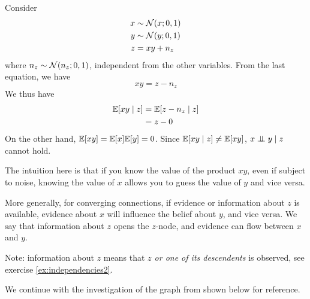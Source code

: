 \begin{exenumerate}
\begin{solution}
     Consider
     \begin{align}
       x & \sim \mathcal{N}(x;0, 1)\\ y & \sim \mathcal{N}(y;0, 1)\\ z&= xy +
       n_z
     \end{align}
     where $n_z \sim \mathcal{N}(n_z; 0, 1)$, independent from the other
     variables. From the last equation, we have
     \begin{equation}
       x y = z - n_z
     \end{equation}
     We thus have
     \begin{align}
       \mathbb{E}[xy \mid z] & = \mathbb{E}[z - n_z \mid z] \\ &= z - 0
     \end{align}
     On the other hand, $\mathbb{E}[x y] = \mathbb{E}[x]\mathbb{E}[y] = 0$. Since $\mathbb{E}[xy \mid z] \neq \mathbb{E}[x y]$, $x \mathrel{\perp\mspace{-10mu}\perp} y \mid z$ cannot hold.

     The intuition here is that if you know the value of the product
     $xy$, even if subject to noise, knowing the value of $x$ allows
     you to guess the value of $y$ and vice versa.
     
     More generally, for converging connections, if evidence or
     information about $z$ is available, evidence about $x$ will
     influence the belief about $y$, and vice versa. We say that
     information about $z$ opens the $z$-node, and evidence can flow
     between $x$ and $y$.
     
     Note: information about $z$ means that \emph{$z$ or one of its
       descendents} is observed, see exercise \ref{ex:independencies2}.
 
\end{solution}
  
\end{exenumerate}



\label{ex:ordered-local-d-sep-independencies01}
We continue with the investigation of the graph from  shown below for reference.

\begin{center}
  \end{center}

